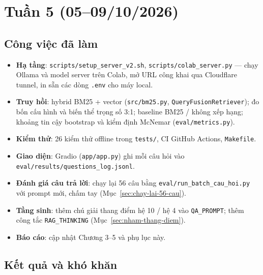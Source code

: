 \section{Tuần 5 (05--09/10/2026)}

\subsection{Công việc đã làm}

\begin{itemize}
  \item \textbf{Hạ tầng}: \texttt{scripts/setup\_server\_v2.sh}, \texttt{scripts/colab\_server.py} --- chạy
        Ollama và model server trên Colab, mở URL công khai qua Cloudflare tunnel, in sẵn các dòng
        \texttt{.env} cho máy local.
  \item \textbf{Truy hồi}: hybrid BM25 + vector (\texttt{src/bm25.py}, \texttt{QueryFusionRetriever}); đo
        bốn cấu hình và biến thể trọng số 3:1; baseline BM25 / không xếp hạng; khoảng tin cậy bootstrap và
        kiểm định McNemar (\texttt{eval/metrics.py}).
  \item \textbf{Kiểm thử}: 26 kiểm thử offline trong \texttt{tests/}, CI GitHub Actions, \texttt{Makefile}.
  \item \textbf{Giao diện}: Gradio (\texttt{app/app.py}) ghi mỗi câu hỏi vào
        \texttt{eval/results/questions\_log.jsonl}.
  \item \textbf{Đánh giá câu trả lời}: chạy lại 56 câu bằng \texttt{eval/run\_batch\_cau\_hoi.py} với prompt
        mới, chấm tay (Mục~\ref{sec:chay-lai-56-cau}).
  \item \textbf{Tầng sinh}: thêm chú giải thang điểm hệ 10 / hệ 4 vào \texttt{QA\_PROMPT}; thêm công tắc
        \texttt{RAG\_THINKING} (Mục~\ref{sec:nham-thang-diem}).
  \item \textbf{Báo cáo}: cập nhật Chương 3--5 và phụ lục này.
\end{itemize}

\subsection{Kết quả và khó khăn}

